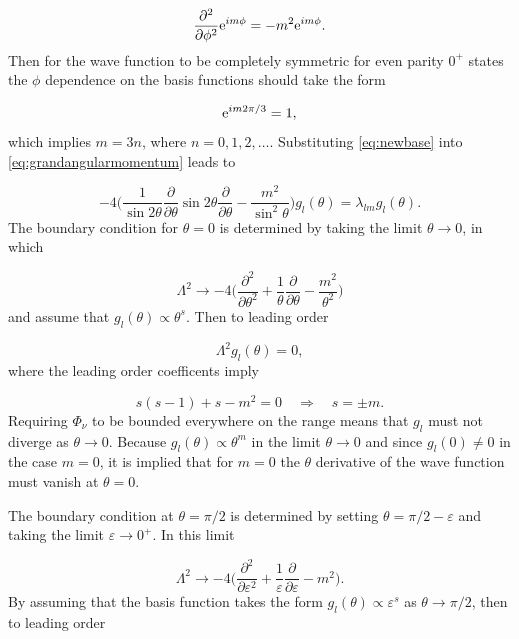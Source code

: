 \begin{equation}
\frac{\partial^{2}}{\partial \phi^{2}} \mathrm{e}^{ i m \phi} = -m^{2} \mathrm{e}^{ i m \phi}.
\end{equation}
Then for the wave function to be completely symmetric for even parity $0^+$ states the $\phi$ dependence on the basis functions should take the form

\begin{equation}
\mathrm{e}^{ i m 2\pi/3} = 1,
\end{equation} 
which implies $m = 3n$, where $n=0,1,2,\ldots$. Substituting \eqref{eq:newbase} into  \eqref{eq:grandangularmomentum} leads to

\begin{equation}
 -4\Bigg(\frac{1}{\sin 2\theta} \frac{\partial}{\partial \theta} \sin 2\theta \frac{\partial}{\partial \theta} - \frac{m^{2}}{\sin^{2}\theta}\Bigg) g_{l}(\theta) = \lambda_{l m} g_{l}(\theta).
\end{equation}
The boundary condition for $\theta=0$ is determined by taking the limit $\theta \rightarrow 0$, in which  

\begin{equation}
\Lambda^{2} \rightarrow -4\Bigg(\frac{\partial^{2}}{\partial \theta^{2}} + \frac{1}{\theta} \frac{\partial}{\partial \theta} - \frac{m^{2}}{\theta^{2}}\Bigg)
\end{equation}
and assume that $g_l(\theta) \propto \theta^s$. Then to leading order 

\begin{equation}
\Lambda^{2} g_l(\theta) = 0,  
\end{equation}
where the leading order coefficents imply

\begin{equation}
s(s-1)+s-m^2 = 0 \quad \Rightarrow \quad s=\pm m.
\end{equation}
Requiring $\Phi_{\nu}$ to be bounded everywhere on the range means that $g_l$ must not diverge as $\theta \rightarrow 0$. Because $g_l(\theta) \propto \theta^m$ in the limit $\theta \rightarrow 0$ and since $g_l(0) \neq 0$ in the case $m=0$, it is implied that for $m = 0$ the $\theta$ derivative of the wave function must vanish at $\theta=0$. 

The boundary condition at $\theta = \pi/2$ is determined by setting $\theta=\pi/2-\varepsilon$ and taking the limit $\varepsilon \rightarrow 0^+$. In this limit

\begin{equation}
\Lambda^{2} \rightarrow -4\Bigg(\frac{\partial^{2}}{\partial \varepsilon^{2}} + \frac{1}{\varepsilon} \frac{\partial}{\partial \varepsilon} - m^{2}\Bigg).
\end{equation}
By assuming that the basis function takes the form $g_l(\theta) \propto \varepsilon ^s$ as $\theta \rightarrow \pi/2$, then to leading order

